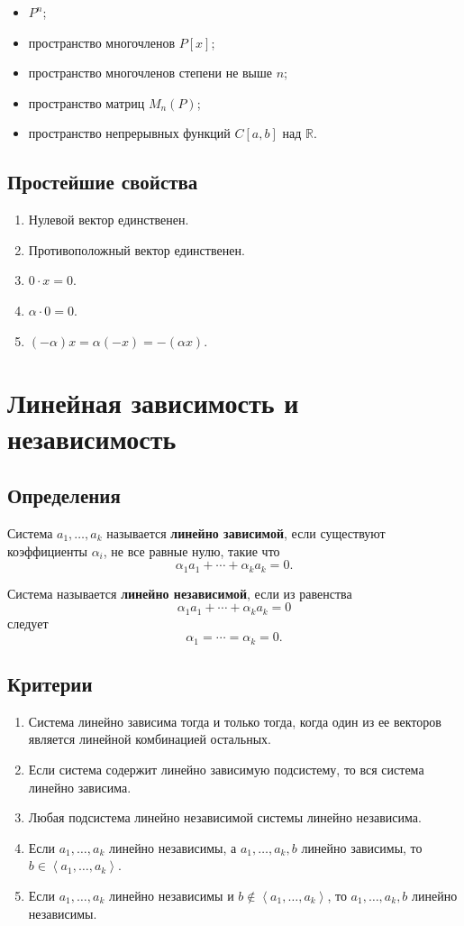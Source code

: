 \documentclass[12pt,a4paper]{article}
\newcommand{\R}{\mathbb{R}}
\newcommand{\Lin}[1]{\left\langle #1 \right\rangle}
\begin{document}
\begin{itemize}
    \item $P^n$;
    \item пространство многочленов $P[x]$;
    \item пространство многочленов степени не выше $n$;
    \item пространство матриц $M_n(P)$;
    \item пространство непрерывных функций $C[a,b]$ над $\R$.
\end{itemize}

\subsection*{Простейшие свойства}

\begin{enumerate}
    \item Нулевой вектор единственен.
    \item Противоположный вектор единственен.
    \item $0\cdot x=0$.
    \item $\alpha\cdot0=0$.
    \item $(-\alpha)x=\alpha(-x)=-(\alpha x)$.
\end{enumerate}

\section{Линейная зависимость и независимость}

\subsection*{Определения}

Система $a_1,\ldots,a_k$ называется \textbf{линейно зависимой}, если существуют коэффициенты $\alpha_i$, не все равные нулю, такие что
\[
    \alpha_1a_1+\cdots+\alpha_ka_k=0.
\]

Система называется \textbf{линейно независимой}, если из равенства
\[
    \alpha_1a_1+\cdots+\alpha_ka_k=0
\]
следует
\[
    \alpha_1=\cdots=\alpha_k=0.
\]

\subsection*{Критерии}

\begin{enumerate}
    \item Система линейно зависима тогда и только тогда, когда один из ее векторов является линейной комбинацией остальных.
    \item Если система содержит линейно зависимую подсистему, то вся система линейно зависима.
    \item Любая подсистема линейно независимой системы линейно независима.
    \item Если $a_1,\ldots,a_k$ линейно независимы, а $a_1,\ldots,a_k,b$ линейно зависимы, то $b\in\Lin{a_1,\ldots,a_k}$.
    \item Если $a_1,\ldots,a_k$ линейно независимы и $b\notin\Lin{a_1,\ldots,a_k}$, то $a_1,\ldots,a_k,b$ линейно независимы.
\end{enumerate}
\end{document}
